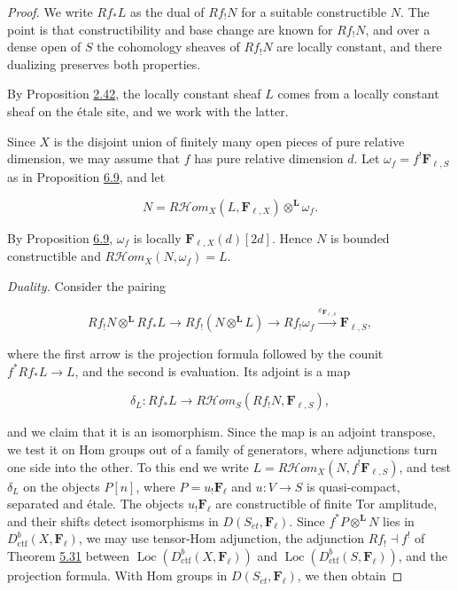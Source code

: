 \documentclass[11pt]{article}
\providecommand{\Fell}{}\renewcommand{\Fell}{\mathbf F_\ell}
\providecommand{\Loc}{}\renewcommand{\Loc}{\operatorname{Loc}}
\providecommand{\cHom}{}\renewcommand{\cHom}{R\mathcal{H}\!om}
\begin{document}
\begin{proof}[{Proof}]\label{bp546}%
We write \(Rf_*L\) as the dual of \(Rf_!N\) for a suitable constructible \(N\). The point is that constructibility and base change are known for \(Rf_!N\), and over a dense open of \(S\) the cohomology sheaves of \(Rf_!N\) are locally constant, and there dualizing preserves both properties.

By Proposition \hyperref[bp126]{2.42}, the locally constant sheaf \(L\) comes from a locally constant sheaf on the étale site, and we work with the latter.

Since \(X\) is the disjoint union of finitely many open pieces of pure relative dimension, we may assume that \(f\) has pure relative dimension \(d\). Let \(\omega_f=f^!\mathbf F_{\ell,S}\) as in Proposition \hyperref[bp542]{6.9}, and let

\[
N=\cHom_X(L,\mathbf F_{\ell,X})\otimes^{\mathbf L}\omega_f .
\]

By Proposition \hyperref[bp542]{6.9}, \(\omega_f\) is locally \(\mathbf F_{\ell,X}(d)[2d]\). Hence \(N\) is bounded constructible and \(\cHom_X(N,\omega_f)=L\).

\emph{Duality.} Consider the pairing

\[
Rf_!N\otimes^{\mathbf L}Rf_*L
\longrightarrow Rf_!(N\otimes^{\mathbf L}L)
\longrightarrow Rf_!\omega_f
\xrightarrow{\varepsilon_{\mathbf F_{\ell,S}}}\mathbf F_{\ell,S},
\tag{6.15}
\]

where the first arrow is the projection formula followed by the counit \(f^*Rf_*L\to L\), and the second is evaluation. Its adjoint is a map

\[
\delta_L:Rf_*L
\longrightarrow \cHom_S(Rf_!N,\mathbf F_{\ell,S}),
\tag{6.16}
\]

and we claim that it is an isomorphism. Since the map is an adjoint transpose, we test it on Hom groups out of a family of generators, where adjunctions turn one side into the other. To this end we write \(L=\cHom_X(N,f^!\mathbf F_{\ell,S})\), and test \(\delta_L\) on the objects \(P[n]\), where \(P=u_!\Fell\) and \(u:V\to S\) is quasi-compact, separated and étale. The objects \(u_!\Fell\) are constructible of finite Tor amplitude, and their shifts detect isomorphisms in \(D(S_{\acute{e}t},\Fell)\). Since \(f^*P\otimes^{\mathbf L}N\) lies in \(D^b_{\mathrm{ctf}}(X,\Fell)\), we may use tensor-Hom adjunction, the adjunction \(Rf_!\dashv f^!\) of Theorem \hyperref[bp506]{5.31} between \(\Loc(D^b_{\mathrm{ctf}}(X,\Fell))\) and \(\Loc(D^b_{\mathrm{ctf}}(S,\Fell))\), and the projection formula. With Hom groups in \(D(S_{\acute{e}t},\Fell)\), we then obtain


\end{proof}
\end{document}

